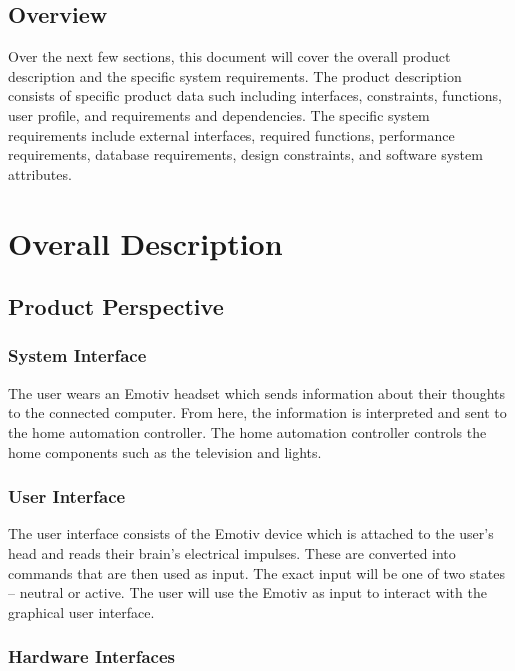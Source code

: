 \documentclass{article}
\begin{document}
\subsection{Overview}

Over the next few sections, this document will cover the overall product description and the 
specific system requirements. The product description consists of specific product data such including 
interfaces, constraints, functions, user profile, and requirements and dependencies. The specific system 
requirements include external interfaces, required functions, performance requirements, database 
requirements, design constraints, and software system attributes.

\newpage

\section{Overall Description}

\subsection{Product Perspective}

\subsubsection{System Interface}

The user wears an Emotiv headset which sends information about their thoughts to the connected computer. From here, the information is interpreted and sent to the home automation controller. The home automation controller controls the home components such as the television and lights. 

\subsubsection{User Interface}

	The user interface consists of the Emotiv device which is attached to the user's head and reads their brain's electrical impulses. These are converted into commands that are then used as input. The exact input will be one of two states – neutral or active. The user will use the Emotiv as input to interact with the graphical user interface.

\subsubsection{Hardware Interfaces}
\end{document}

